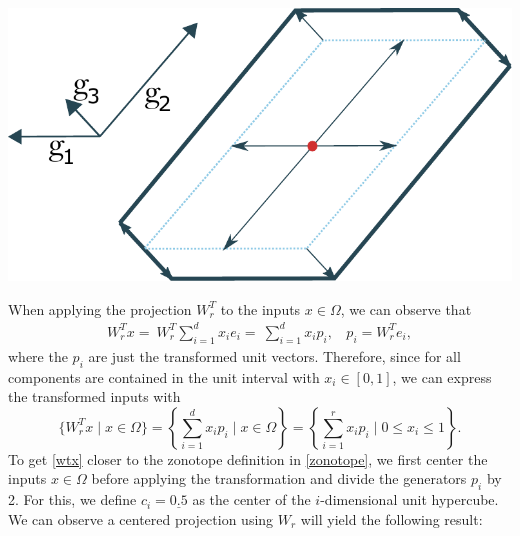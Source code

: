 \documentclass[
  a4paper,  %
  twoside,  %
  bibliography=totoc,
  headsepline,
  cleardoublepage=empty,
  parskip=half,
  draft=false
]{scrbook}
\begin{document}
\begin{mdframed}[style=style]
        \centering
\begin{minipage}{.4\textwidth}
        \centering
  \label{fig:zonotope}
    \end{minipage}%
    \begin{minipage}{0.6\textwidth}
        \centering
        \vspace{3.5mm}
  \includegraphics[width=0.8\linewidth]{graphics/zonotope}
  \hspace{-5.5mm}
    \end{minipage}
\end{mdframed}
%
When applying the projection $W_r^T$ to the inputs $x \in \Omega$, we can observe that
\begin{equation}
\begin{split}
W_r^T x=~W_r^T \sum_{i=1}^d x_i e_i=~\sum_{i=1}^d x_i p_i , ~~~~ p_i=W_r^T e_i,
\end{split}
\end{equation}
where the $p_i$ are just the transformed unit vectors.
Therefore, since for all components are contained in the unit interval with $x_i \in [0,1]$, we can express the transformed inputs with
\begin{equation}
\{W_r^T x \mid x \in \Omega\}=\left\{\sum_{i=1}^d x_i p_i \mid x \in \Omega \right\}=\left\{ \sum_{i=1}^r x_i p_i \mid 0 \leq x_i \leq 1\right\}.
\label{wtx}
\end{equation}
To get \cref{wtx} closer to the zonotope definition in \cref{zonotope}, we first center the inputs $x \in \Omega$ before applying the transformation and divide the generators $p_i$ by 2.
For this, we define $c_i=\underline{0.5}$ as the center of the $i$-dimensional unit hypercube.
We can observe a centered projection using $W_r$ will yield the following result:
\end{document}
